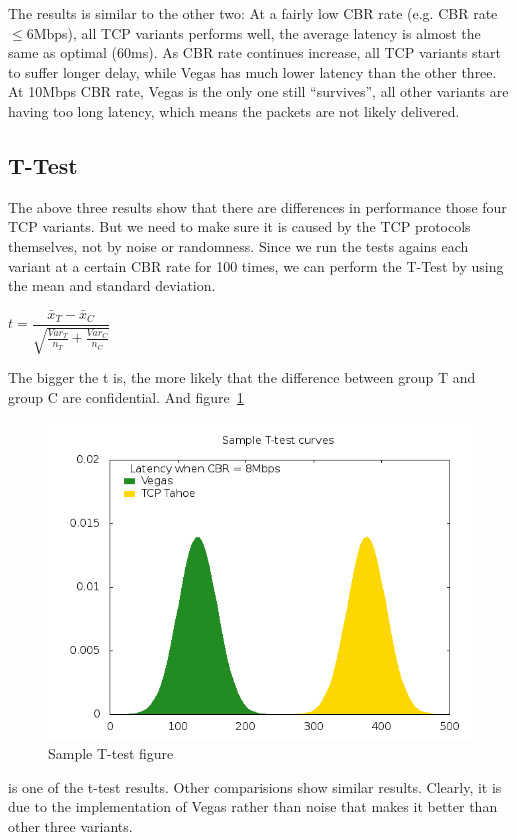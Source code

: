 \documentclass[10pt, conference]{lib/IEEEtran}
\begin{document}
The results is similar to the other two: At a fairly low CBR rate 
(e.g. CBR rate$ \le 6$Mbps), all TCP variants performs well, the 
average latency is almost the same as optimal (60ms). As CBR rate 
continues increase, all TCP variants start to suffer longer delay, 
while Vegas has much lower latency than the other three. At 10Mbps 
CBR rate, Vegas is the only one still ``survives'', all other variants
are having too long latency, which means the packets are not likely 
delivered.

\subsection{T-Test}
The above three results show that there are differences in performance 
those four TCP variants. But we need to make sure it is caused by the
TCP protocols themselves, not by noise or randomness. Since we run the 
tests agains each variant at a certain CBR rate for 100 times, we can
perform the T-Test by using the mean and standard deviation. 
\begin{center}
    $t = \dfrac{\bar{x}_T -\bar{x}_C}{\sqrt{\frac{Var_T}{n_T} + \frac{Var_C}{n_C}}}$
\end{center}
The bigger the t is, the more likely that the difference between group T and group C are confidential. And figure~\ref{fig:exp1_t_test}
\begin{figure}[!htb]
    \centering
    \includegraphics[width=0.9\linewidth]{plot/exp1-t-test.png}
    \caption{Sample T-test figure}
    \label{fig:exp1_t_test}
\end{figure}
is one of the t-test results. Other comparisions show similar results.
Clearly, it is due to the implementation of Vegas rather than noise 
that makes it better than other three variants.
\end{document}
